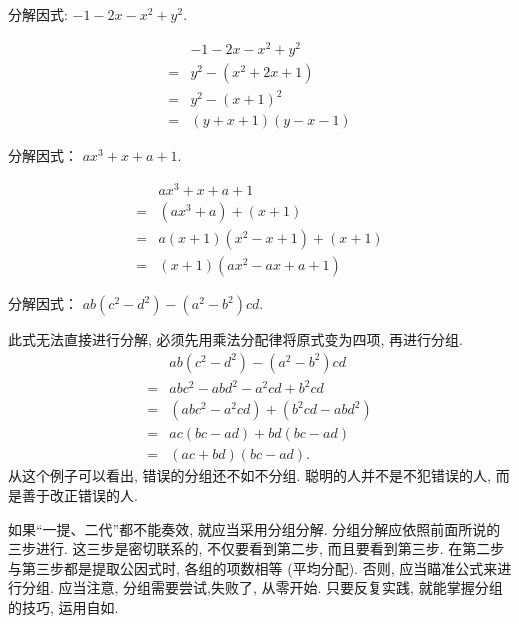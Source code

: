 \begin{example}[瞄准公式]
	分解因式: $-1-2 x-x^{2}+y^{2}$.
\end{example}
\begin{solution}
	\begin{align*}
		  & -1-2 x-x^{2}+y^{2}             \\
		= & y^{2}-\left(x^{2}+2 x+1\right) \\
		= & y^{2}-(x+1)^{2}                \\
		= & (y+x+1)(y-x-1)
	\end{align*}
\end{solution}

\begin{example}[瞄准公式]
	分解因式： $a x^{3}+x+a+1$.
\end{example}
\begin{solution}
	\begin{align*}
		  & a x^{3}+x+a+1                      \\
		= & \left(a x^{3}+a\right)+(x+1)       \\
		= & a(x+1)\left(x^{2}-x+1\right)+(x+1) \\
		= & (x+1)\left(a x^{2}-a x+a+1\right)
	\end{align*}
\end{solution}

\begin{example}[从零开始]
	分解因式： $a b\left(c^{2}-d^{2}\right)-\left(a^{2}-b^{2}\right) c d.$
\end{example}
\begin{solution}
	此式无法直接进行分解, 必须先用乘法分配律将原式变为四项, 再进行分组.
	\begin{align*}
		  & a b\left(c^{2}-d^{2}\right)-\left(a^{2}-b^{2}\right) c d          \\
		= & a b c^{2}-a b d^{2}-a^{2} c d+b^{2} c d                           \\
		= & \left(a b c^{2}-a^{2} c d\right)+\left(b^{2} c d-a b d^{2}\right) \\
		= & a c(b c-a d)+b d(b c-a d)                                         \\
		= & (a c+b d)(b c-a d) .
	\end{align*}
	从这个例子可以看出, 错误的分组还不如不分组. 聪明的人并不是不犯错误的人, 而是善于改正错误的人.
\end{solution}
如果“一提、二代”都不能奏效, 就应当采用分组分解. 分组分解应依照前面所说的三步进行. 这三步是密切联系的, 不仅要看到第二步, 而且要看到第三步. 在第二步与第三步都是提取公因式时, 各组的项数相等 (平均分配). 否则, 应当瞄准公式来进行分组. 应当注意, 分组需要尝试,失败了, 从零开始. 只要反复实践, 就能掌握分组的技巧, 运用自如.


